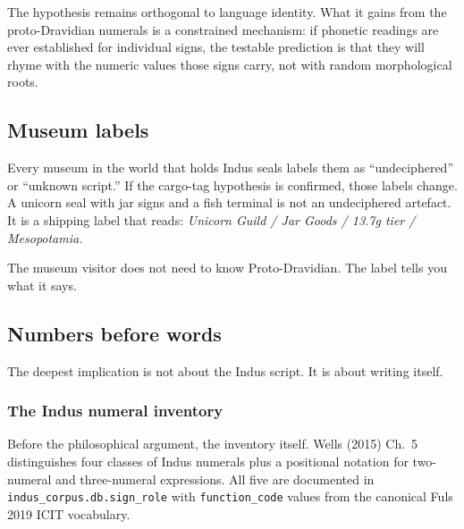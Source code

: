 The hypothesis remains orthogonal to language identity. What it gains
from the proto-Dravidian numerals is a constrained mechanism: if
phonetic readings are ever established for individual signs, the
testable prediction is that they will rhyme with the numeric values
those signs carry, not with random morphological roots.

\subsection{Museum labels}

Every museum in the world that holds Indus seals labels them as
``undeciphered'' or ``unknown script.'' If the cargo-tag hypothesis
is confirmed, those labels change. A unicorn seal with jar signs
and a fish terminal is not an undeciphered artefact. It is a
shipping label that reads: \textit{Unicorn Guild / Jar Goods /
13.7g tier / Mesopotamia.}

The museum visitor does not need to know Proto-Dravidian. The
label tells you what it says.

\subsection{Numbers before words}

The deepest implication is not about the Indus script. It is
about writing itself.

\subsubsection*{The Indus numeral inventory}

Before the philosophical argument, the inventory itself. Wells (2015)
Ch.~5 distinguishes four classes of Indus numerals plus a positional
notation for two-numeral and three-numeral expressions. All five are
documented in \texttt{indus\_corpus.db.sign\_role} with
\texttt{function\_code} values from the canonical Fuls 2019
ICIT vocabulary.

